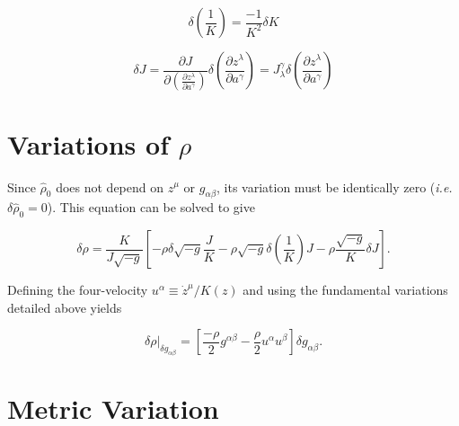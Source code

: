 \begin{equation}
\delta \left( \frac{1}{K} \right) = \frac{-1}{K^2} \delta K
\end{equation}

\begin{equation}
\delta J = \frac{ \partial J}{\partial \left( \frac{\partial z^\lambda}{\partial a^\gamma} \right)} \delta \left( \frac{\partial z^\lambda}{\partial a^\gamma} \right) = J^{\gamma}_{\lambda} \delta \left( \frac{\partial z^\lambda}{\partial a^\gamma} \right)
\end{equation}


\section{Variations of $\rho$}

Since ${\hat \rho}_0$ does not depend on $z^{\mu}$ or $g_{\alpha \beta}$, its variation must be identically zero ({\it i.e.} $\delta {\hat \rho}_0 = 0$).  This equation can be solved to give 

\begin{equation}
\delta \rho = \frac{K}{J \sqrt{-g}} \left[ -\rho \delta \sqrt{-g} \frac{J}{K} - \rho \sqrt{-g} \delta \left( \frac{1}{K} \right) J - \rho \frac{\sqrt{-g}}{K} \delta J \right].
\end{equation}

Defining the four-velocity $u^{\alpha} \equiv {\dot z}^{\mu}/K(z)$ and using the fundamental variations detailed above yields
 
\begin{equation}
\delta \rho \vert _{\delta g_{\alpha\beta}} = \left[ \frac{-\rho}{2} g^{\alpha \beta} - \frac{\rho}{2} u^{\alpha}u^{\beta} \right] \delta g_{\alpha \beta}.
\end{equation}


\section{Metric Variation}

